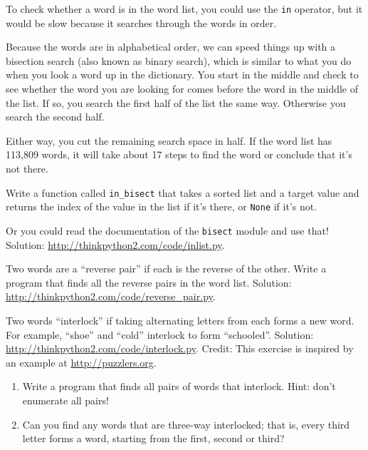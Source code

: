 \documentclass[10pt]{book}
\begin{document}
\begin{exercise}
\label{wordlist1}
\label{bisection}

To check whether a word is in the word list, you could use
the {\tt in} operator, but it would be slow because it searches
through the words in order.

Because the words are in alphabetical order, we can speed things up
with a bisection search (also known as binary search), which is
similar to what you do when you look a word up in the dictionary.  You
start in the middle and check to see whether the word you are looking
for comes before the word in the middle of the list.  If so, you
search the first half of the list the same way.  Otherwise you search
the second half.

Either way, you cut the remaining search space in half.  If the
word list has 113,809 words, it will take about 17 steps to
find the word or conclude that it's not there.

Write a function called \verb"in_bisect" that takes a sorted list
and a target value and returns the index of the value
in the list if it's there, or {\tt None} if it's not.

Or you could read the documentation of the {\tt bisect} module
and use that!  Solution: \url{http://thinkpython2.com/code/inlist.py}.

\end{exercise}

\begin{exercise}

Two words are a ``reverse pair'' if each is the reverse of the
other.  Write a program that finds all the reverse pairs in the
word list.  Solution: \url{http://thinkpython2.com/code/reverse_pair.py}.

\end{exercise}

\begin{exercise}

Two words ``interlock'' if taking alternating letters from each forms
a new word.  For example, ``shoe'' and ``cold''
interlock to form ``schooled''.
Solution: \url{http://thinkpython2.com/code/interlock.py}.
Credit: This exercise is inspired by an example at \url{http://puzzlers.org}.

\begin{enumerate}

\item Write a program that finds all pairs of words that interlock.
  Hint: don't enumerate all pairs!

\item Can you find any words that are three-way interlocked; that is,
  every third letter forms a word, starting from the first, second or
  third?

\end{enumerate}
\end{exercise}
\end{document}
